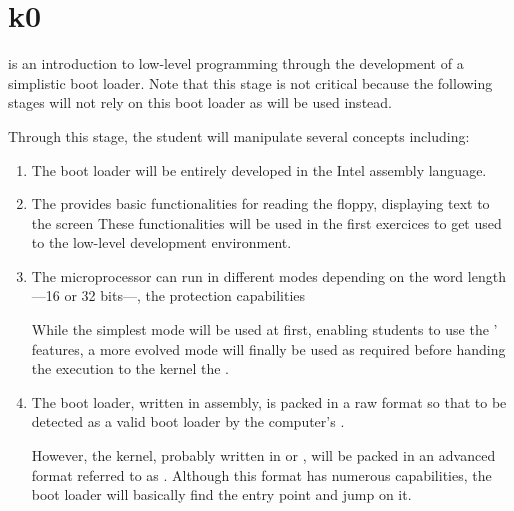 %
%
%
%
%
%

%
%

\chapter{k0}
\label{chapter:k0}

 is an introduction to low-level programming through the development
of a simplistic boot loader. Note that this stage is not critical because
the following stages will not rely on this boot loader as  will be used instead.

Through this stage, the student will manipulate several concepts including:

\begin{enumerate}
  \item

    The boot loader will be entirely developed in the Intel 
    assembly language.
  \item

    The  provides basic functionalities for reading the floppy,
    displaying text to the screen \etc{} These functionalities will be used
    in the first exercices to get used to the low-level development
    environment.
  \item

    The  microprocessor can run in different modes depending on
    the word length---16 or 32 bits---, the protection capabilities \etc{}

    \-

    While the simplest mode will be used at first, enabling students to
    use the ' features, a more evolved mode will finally be used
    as required before handing the execution to the kernel \ie{} the
    .
  \item

    The boot loader, written in assembly, is packed in a raw format so that
    to be detected as a valid boot loader by the computer's .

    \-

    However, the kernel, probably written in  or , will
    be packed in an advanced format referred to as . Although this
    format has numerous capabilities, the boot loader will basically
    find the entry point and jump on it.
\end{enumerate}

